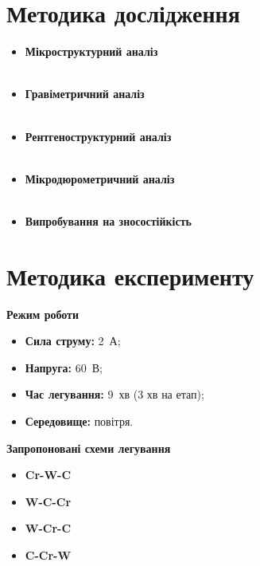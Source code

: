 \documentclass[12pt,aspectratio=43,hyperref={unicode}]{beamer}
\begin{document}
\section{Методика дослідження}
\begin{frame}
  \begin{itemize}
  \item \textbf{\large Мікроструктурний аналіз}\\
  ~
  \item \textbf{\large Гравіметричний аналіз}\\%
  ~
  \item \textbf{\large Рентгеноструктурний аналіз}\\
    ~
    \item \textbf{\large Мікродюрометричний аналіз}\\
~
  \item \textbf{\large Випробування на зносостійкість}
  \end{itemize}
\end{frame}

\section{Методика експерименту}
\begin{frame}

  \begin{block}{\textbf{Режим роботи}}
    \begin{itemize}
    \item \textbf{Сила струму:} 2~А;
    \item \textbf{Напруга:} 60~В;
    \item \textbf{Час легування:} 9~хв (3 хв на етап);
    \item \textbf{Середовище:} повітря.
    \end{itemize}
\end{block}

  \begin{block}{\textbf{Запропоновані схеми легування}}
  \begin{multicols}{2}
  \begin{itemize}
  \item \textbf{Cr-W-C}
  \item \textbf{W-C-Cr}
  \item \textbf{W-Cr-C}
  \item \textbf{C-Cr-W}
  \end{itemize}
  \end{multicols}

\end{block}
\end{frame}
\end{document}
